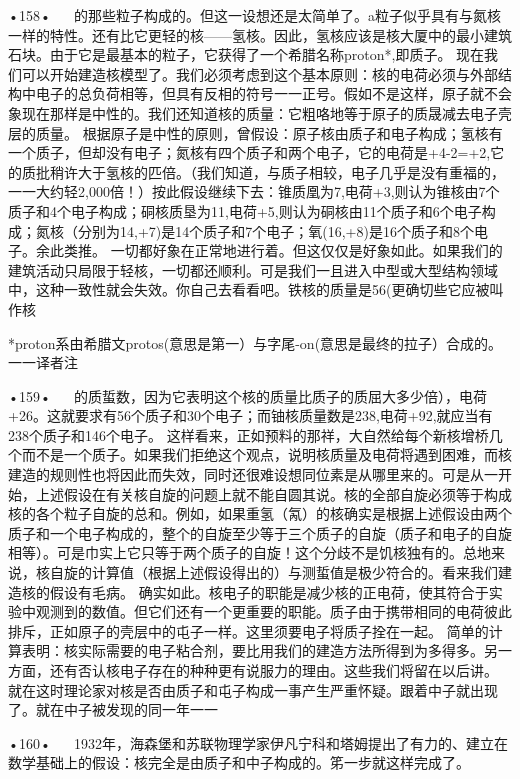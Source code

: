•158•
  
的那些粒子构成的。但这一设想还是太简单了。a粒子似乎具有与氮核一样的特性。还有比它更轻的核——氢核。因此，氢核应该是核大厦中的最小建筑石块。由于它是最基本的粒子，它获得了一个希腊名称proton*,即质子。
现在我们可以开始建造核模型了。我们必须考虑到这个基本原则：核的电荷必须与外部结构中电子的总负荷相等，但具有反相的符号一一正号。假如不是这样，原子就不会象现在那样是中性的。我们还知道核的质量：它粗咯地等于原子的质晟减去电子壳层的质量。
根据原子是中性的原则，曾假设：原子核由质子和电子构成；氢核有一个质子，但却没有电子；氮核有四个质子和两个电子，它的电荷是+4-2=+2,它的质批稍许大于氢核的匹倍。（我们知道，与质子相较，电子几乎是没有重福的，一一大约轻2,000倍！）按此假设继续下去：锥质凰为7,电荷+3,则认为锥核由7个质子和4个电子构成；硐核质垦为11,电荷+5,则认为硐核由11个质子和6个电子构成；氮核（分别为14,+7)是14个质子和7个电子；氧(16,+8)是16个质子和8个电子。余此类推。
一切都好象在正常地进行着。但这仅仅是好象如此。如果我们的建筑活动只局限于轻核，一切都还顺利。可是我们一且进入中型或大型结构领域中，这种一致性就会失效。你自己去看看吧。铁核的质量是56(更确切些它应被叫作核

*proton系由希腊文protos(意思是第一）与字尾-on(意思是最终的拉子）合成的。一一译者注

•159•
  
的质蜇数，因为它表明这个核的质量比质子的质屈大多少倍），电荷+26。这就要求有56个质子和30个电子；而铀核质量数是238,电荷+92,就应当有238个质子和146个电子。
这样看来，正如预料的那祥，大自然给每个新核增桥几个而不是一个质子。如果我们拒绝这个观点，说明核质量及电荷将遇到困难，而核建造的规则性也将因此而失效，同时还很难设想同位素是从哪里来的。可是从一开始，上述假设在有关核自旋的问题上就不能自圆其说。核的全部自旋必须等于构成核的各个粒子自旋的总和。例如，如果重氢（氝）的核确实是根据上述假设由两个质子和一个电子构成的，整个的自旋至少等于三个质子的自旋（质子和电子的自旋相等）。可是巾实上它只等于两个质子的自旋！这个分歧不是饥核独有的。总地来说，核自旋的计算值（根据上述假设得出的）与测蜇值是极少符合的。看来我们建造核的假设有毛病。
确实如此。核电子的职能是减少核的正电荷，使其符合于实验中观测到的数值。但它们还有一个更重要的职能。质子由于携带相同的电荷彼此排斥，正如原子的壳层中的屯子一样。这里须要电子将质子拴在一起。
简单的计算表明：核实际需要的电子粘合剂，要比用我们的建造方法所得到为多得多。另一方面，还有否认核电子存在的种种更有说服力的理由。这些我们将留在以后讲。
就在这时理论家对核是否由质子和屯子构成一事产生严重怀疑。跟着中子就出现了。就在中子被发现的同一年一一

•160•
  
1932年，海森堡和苏联物理学家伊凡宁科和塔姆提出了有力的、建立在数学基础上的假设：核完全是由质子和中子构成的。笫一步就这样完成了。

